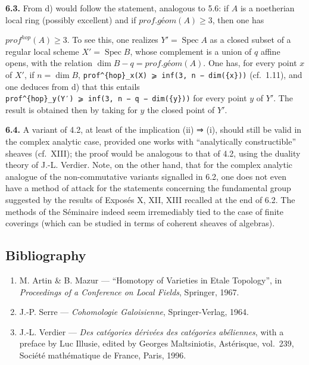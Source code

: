 \documentclass[
]{article}
\providecommand{\tightlist}{%
  \setlength{\itemsep}{0pt}\setlength{\parskip}{0pt}}
\begin{document}
\textbf{6.3.} From d) would follow the statement, analogous to 5.6: if
\(A\) is a noetherian local ring (possibly excellent) and if
\(prof.géom(A) \geqslant 3\), then one has

\(prof^{hop}(A) \geqslant 3\). To see this, one realizes
\(Y' = \operatorname{Spec} A\) as a closed subset of a regular local
scheme \(X' = \operatorname{Spec} B\), whose complement is a union of
\(q\) affine opens, with the relation
\(\dim B - q = prof.géom(A)\). One has, for every point \(x\) of
\(X'\), if \(n = \dim B\),
\texttt{prof\^{}\{hop\}\_x(X)\ ⩾\ inf(3,\ n\ −\ dim(\{x\}))} (cf.~1.11),
and one deduces from d) that this entails
\texttt{prof\^{}\{hop\}\_y(Y′)\ ⩾\ inf(3,\ n\ −\ q\ −\ dim(\{y\}))} for
every point \(y\) of \(Y'\). The result is obtained then by taking for
\(y\) the closed point of \(Y'\).

\textbf{6.4.} A variant of 4.2, at least of the implication (ii) ⇒ (i),
should still be valid in the complex analytic case, provided one works
with ``analytically constructible'' sheaves (cf.~XIII); the proof would
be analogous to that of 4.2, using the duality theory of J.-L. Verdier.
Note, on the other hand, that for the complex analytic analogue of the
non-commutative variants signalled in 6.2, one does not even have a
method of attack for the statements concerning the fundamental group
suggested by the results of Exposés X, XII, XIII recalled at the end of
6.2. The methods of the Séminaire indeed seem irremediably tied to the
case of finite coverings (which can be studied in terms of coherent
sheaves of algebras).

\subsection{Bibliography}\label{bibliography-4}

\begin{enumerate}
\def\labelenumi{\arabic{enumi}.}
\tightlist
\item
  M. Artin \& B. Mazur --- ``Homotopy of Varieties in Etale Topology'',
  in \emph{Proceedings of a Conference on Local Fields}, Springer, 1967.
\item
  J.-P. Serre --- \emph{Cohomologie Galoisienne}, Springer-Verlag, 1964.
\item
  J.-L. Verdier --- \emph{Des catégories dérivées des catégories
  abéliennes}, with a preface by Luc Illusie, edited by Georges
  Maltsiniotis, Astérisque, vol.~239, Société mathématique de France,
  Paris, 1996.
\end{enumerate}
\end{document}
